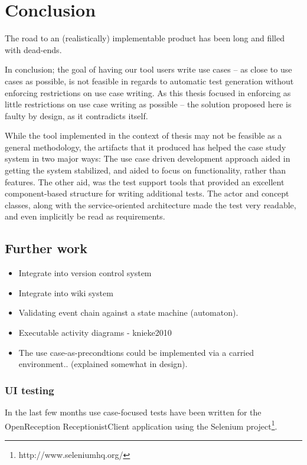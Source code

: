 \chapter{Conclusion}
The road to an (realistically) implementable product has been long and filled with dead-ends.\medskip

\noindent In conclusion; the goal of having our tool users write use cases -- as close to use cases as possible, is not feasible in regards to automatic test generation without enforcing restrictions on use case writing. As this thesis focused in enforcing as little restrictions on use case writing as possible -- the solution proposed here is faulty by design, as it contradicts itself.\medskip

\noindent While the tool implemented in the context of thesis may not be feasible as a general methodology, the artifacts that it produced has helped the case study system in two major ways: The use case driven development approach aided in getting the system stabilized, and aided to focus on functionality, rather than features. The other aid, was the test support tools that provided an excellent component-based structure for writing additional tests. The actor and concept classes, along with the service-oriented architecture made the test very readable, and even implicitly be read as requirements.
\section{Further work}
\begin{itemize}
  \item Integrate into version control system
  \item Integrate into wiki system
  \item Validating event chain against a state machine (automaton).
  \item Executable activity diagrams - knieke2010 
  \item The use case-as-precondtions could be implemented via a carried environment.. (explained somewhat in design).
\end{itemize}


\subsection{UI testing}
In the last few months use case-focused tests have been written for the OpenReception ReceptionistClient application using the Selenium project\footnote{http://www.seleniumhq.org/}.

